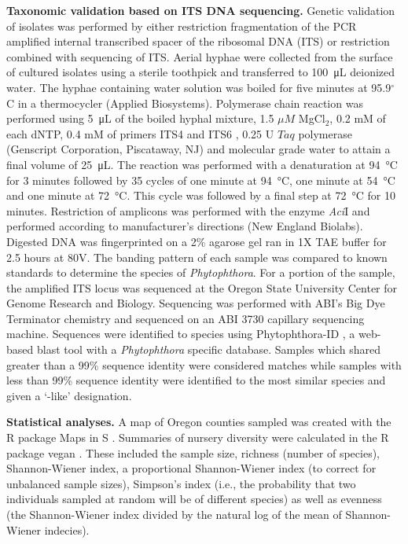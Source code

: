 \documentclass[12pt]{article}
\begin{document}
\textbf{Taxonomic validation based on ITS DNA sequencing.} Genetic validation of isolates was performed by either restriction fragmentation of the PCR amplified internal transcribed spacer of the ribosomal DNA (ITS) or restriction combined with sequencing of ITS.  Aerial hyphae were collected from the surface of cultured isolates using a sterile toothpick and transferred to \SI{100}{\micro\liter} deionized water.  The hyphae containing water solution was boiled for five minutes at 95.9$^\circ$C  in a thermocycler (Applied Biosystems).  Polymerase chain reaction was performed using \SI{5}{\micro\liter} of the boiled hyphal mixture, 1.5 $\mu M$  MgCl$_{2}$, 0.2 mM of each dNTP, 0.4 mM of primers ITS4 and ITS6 \cite{grunwald_etal_2011, cooke_etal_2000}, 0.25 U $Taq$ polymerase (Genscript Corporation, Piscataway, NJ) and molecular grade water to attain a final volume of \SI{25}{\micro\liter}.  The reaction was performed with a denaturation at \SI{94}{\celsius} for 3 minutes followed by 35 cycles of one minute at \SI{94}{\celsius}, one minute at \SI{54}{\celsius} and one minute at \SI{72}{\celsius}.  This cycle was followed by a final step at \SI{72}{\celsius} for 10 minutes.  Restriction of amplicons was performed with the enzyme \emph{Aci}I and performed according to manufacturer's directions (New England Biolabs).  Digested DNA was fingerprinted on a 2\% agarose gel ran in 1X TAE buffer for 2.5 hours at 80V.  The banding pattern of each sample was compared to known standards  to determine the species of \emph{Phytophthora}.  For a portion of the sample, the amplified ITS locus was sequenced at the Oregon State University Center for Genome Research and Biology.  Sequencing was performed with ABI's Big Dye Terminator chemistry and sequenced on an ABI 3730 capillary sequencing machine.  Sequences were identified to species using Phytophthora-ID \cite{grunwald_etal_2011}, a web-based blast \cite{altschul_etal_1990} tool with a \emph{Phytophthora} specific database.  Samples which shared greater than a 99\% sequence identity were considered matches while samples with less than 99\% sequence identity were identified to the most similar species and given a `-like' designation.

\textbf{Statistical analyses.} A map of Oregon counties sampled was created with the R \cite{R} package Maps in S \cite{r_maps}.  Summaries of nursery diversity were calculated in the R \cite{R} package vegan \cite{vegan}.  These included the sample size, richness (number of species), Shannon-Wiener index, a proportional Shannon-Wiener index (to correct for unbalanced sample sizes), Simpson's index (i.e., the probability that two individuals sampled at random will be of different species) as well as evenness (the Shannon-Wiener index divided by the natural log of the mean of Shannon-Wiener indecies).
\end{document}
